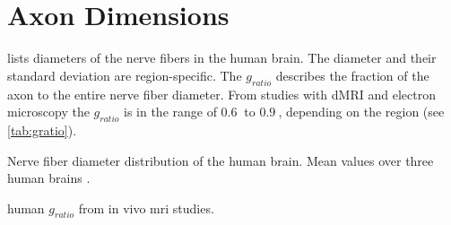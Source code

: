 \section{Axon Dimensions}
\label{sec:axonMicroscopy}
%
 lists diameters of the nerve fibers in the human brain.
The diameter and their standard deviation are region-specific.
The $g_{\mathit{ratio}}$ describes the fraction of the axon to the entire nerve fiber diameter.
From studies with \ac{dMRI} and electron microscopy the $g_{\mathit{ratio}}$ is in the range of $\SI{0.6}{}$ to $\SI{0.9}{}$, depending on the region (see \cref{tab:gratio}).
%
\begin{table}[!b]
\centering
{}
\caption{Nerve fiber diameter distribution of the human brain.
    Mean values over three human brains \cite{Liewald2014}.}
\label{tab:axonDiameter}
\end{table}
%
\begin{table}[!b]
\centering
{}
\caption{human $g_{\mathit{ratio}}$ from in vivo mri studies.}
\label{tab:gratio}
\end{table}
